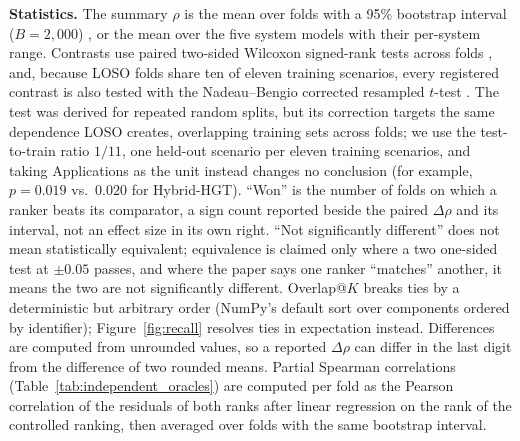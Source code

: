 \documentclass[preprint,3p]{elsarticle}
\begin{document}
\noindent\textbf{Statistics.} The summary $\rho$ is the mean over folds with a 95\% bootstrap interval ($B = 2{,}000$) \cite{efron1993introduction}, or the mean over the five system models with their per-system range. Contrasts use paired two-sided Wilcoxon signed-rank tests across folds \cite{wilcoxon1945individual,arcuri2011practical}, and, because LOSO folds share ten of eleven training scenarios, every registered contrast is also tested with the Nadeau--Bengio corrected resampled $t$-test \cite{nadeau2003inference}. The test was derived for repeated random splits, but its correction targets the same dependence LOSO creates, overlapping training sets across folds; we use the test-to-train ratio $1/11$, one held-out scenario per eleven training scenarios, and taking Applications as the unit instead changes no conclusion (for example, $p = 0.019$ vs.\ $0.020$ for Hybrid-HGT). ``Won'' is the number of folds on which a ranker beats its comparator, a sign count reported beside the paired $\Delta\rho$ and its interval, not an effect size in its own right. ``Not significantly different'' does not mean statistically equivalent; equivalence is claimed only where a two one-sided test at $\pm 0.05$ passes, and where the paper says one ranker ``matches'' another, it means the two are not significantly different. Overlap@$K$ breaks ties by a deterministic but arbitrary order (NumPy's default sort over components ordered by identifier); Figure~\ref{fig:recall} resolves ties in expectation instead. Differences are computed from unrounded values, so a reported $\Delta\rho$ can differ in the last digit from the difference of two rounded means. Partial Spearman correlations (Table~\ref{tab:independent_oracles}) are computed per fold as the Pearson correlation of the residuals of both ranks after linear regression on the rank of the controlled ranking, then averaged over folds with the same bootstrap interval.
\end{document}

